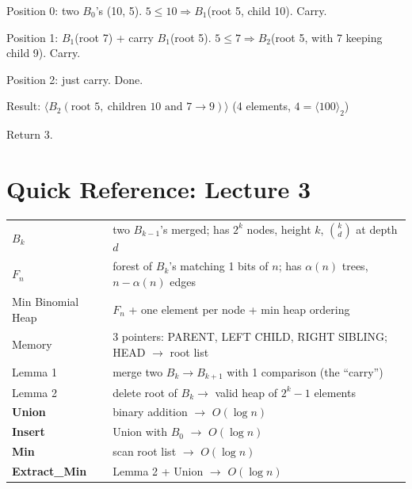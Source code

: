 \documentclass[11pt]{article}
\begin{document}
\begin{examplebox}
\begin{answerband}
\begin{enumerate}[leftmargin=1.4em,itemsep=2pt]
  Position 0: two $B_0$'s (10, 5). $5 \le 10 \Rightarrow B_1$(root 5, child 10). Carry.

  Position 1: $B_1$(root 7) + carry $B_1$(root 5). $5 \le 7 \Rightarrow B_2$(root 5, with 7 keeping child 9). Carry.

  Position 2: just carry. Done.

  Result: $\langle B_2(\text{root } 5,\ \text{children } 10 \text{ and } 7 \to 9) \rangle$ (4 elements, $4 = \langle 100 \rangle_2$) \checkmark
\end{enumerate}

Return 3.
\end{answerband}
\end{examplebox}
\section*{\textcolor{violetT}{Quick Reference: Lecture 3}}
\begin{keybox}
\renewcommand{\arraystretch}{1.4}
\begin{tabular}{l l}
$B_k$ & two $B_{k-1}$'s merged; has $2^k$ nodes, height $k$, $\binom{k}{d}$ at depth $d$\\
$F_n$ & forest of $B_k$'s matching 1 bits of $n$; has $\alpha(n)$ trees, $n{-}\alpha(n)$ edges\\
Min Binomial Heap & $F_n$ + one element per node + min heap ordering\\
Memory & 3 pointers: \textcolor{rustW}{PARENT}, \textcolor{greenO}{LEFT CHILD}, \textcolor{heapblue}{RIGHT SIBLING}; HEAD $\to$ root list\\
Lemma 1 & merge two $B_k \to B_{k+1}$ with 1 comparison (the ``carry'')\\
Lemma 2 & delete root of $B_k \to$ valid heap of $2^k{-}1$ elements\\
\textbf{Union} & binary addition $\to$ $O(\log n)$\\
\textbf{Insert} & Union with $B_0$ $\to$ $O(\log n)$\\
\textbf{Min} & scan root list $\to$ $O(\log n)$\\
\textbf{Extract\_Min} & Lemma 2 + Union $\to$ $O(\log n)$\\
\end{tabular}
\end{keybox}


%
\end{document}
